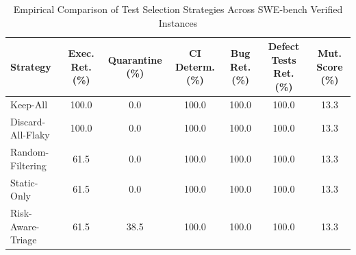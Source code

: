 \begin{table}[t]
\centering
\caption{Empirical Comparison of Test Selection Strategies Across SWE-bench Verified Instances}
\label{tab:strategy_comparison}
\begin{tabular}{lcccccc}
\toprule
\textbf{Strategy} & \textbf{Exec. Ret. (\%)} & \textbf{Quarantine (\%)} & \textbf{CI Determ. (\%)} & \textbf{Bug Ret. (\%)} & \textbf{Defect Tests Ret. (\%)} & \textbf{Mut. Score (\%)} \\
\midrule
Keep-All & 100.0 & 0.0 & 100.0 & 100.0 & 100.0 & 13.3 \\
Discard-All-Flaky & 100.0 & 0.0 & 100.0 & 100.0 & 100.0 & 13.3 \\
Random-Filtering & 61.5 & 0.0 & 100.0 & 100.0 & 100.0 & 13.3 \\
Static-Only & 61.5 & 0.0 & 100.0 & 100.0 & 100.0 & 13.3 \\
Risk-Aware-Triage & 61.5 & 38.5 & 100.0 & 100.0 & 100.0 & 13.3 \\
\bottomrule
\end{tabular}
\end{table}